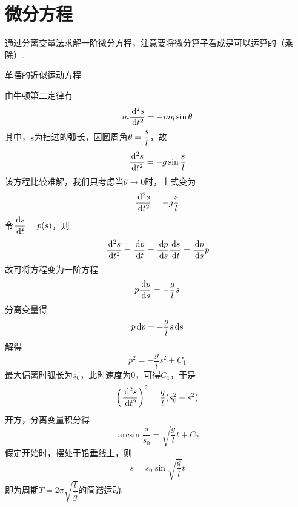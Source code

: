 
\section{微分方程}
通过分离变量法求解一阶微分方程，注意要将微分算子看成是可以运算的（乘除）.
\begin{example}
单摆的近似运动方程.
\end{example}
\begin{analysis}
由牛顿第二定律有
\[m\dfrac{\,\mathrm{d}^2 s}{\,\mathrm{d} t^2}=-mg\sin\theta\]
其中，$s$为扫过的弧长，因圆周角$\displaystyle\theta=\dfrac{s}{l}$，故
\[\dfrac{\,\mathrm{d}^2 s}{\,\mathrm{d} t^2}=-g\sin\dfrac{s}{l}\]
该方程比较难解，我们只考虑当$\theta\to 0$时，上式变为
\[\dfrac{\,\mathrm{d}^2 s}{\,\mathrm{d} t^2}=-g\dfrac{s}{l}\]
令$\dfrac{\,\mathrm{d} s}{\,\mathrm{d} t}=p(s)$，则
\[\dfrac{\,\mathrm{d}^2 s}{\,\mathrm{d} t^2}=\dfrac{\,\mathrm{d} p}{\,\mathrm{d} t}=\dfrac{\,\mathrm{d} p}{\,\mathrm{d} s}\dfrac{\,\mathrm{d} s}{\,\mathrm{d} t}=\dfrac{\,\mathrm{d} p}{\,\mathrm{d} s}p\]
故可将方程变为一阶方程
\[p\dfrac{\,\mathrm{d} p}{\,\mathrm{d} s}=-\dfrac{g}{l}s\]
分离变量得
\[p\,\mathrm{d} p=-\dfrac{g}{l}s\,\mathrm{d} s\]
解得
\[p^2=-\dfrac{g}{l}s^2+C_1\]
最大偏离时弧长为$s_0$，此时速度为$0$，可得$C_1$，于是
\[\left(\dfrac{\,\mathrm{d}^2 s}{\,\mathrm{d} t^2}\right)^2=\dfrac{g}{l}(s_0^2-s^2)\]
开方，分离变量积分得
\[\arcsin\dfrac{s}{s_0}=\sqrt{\dfrac{g}{l}}t+C_2\]
假定开始时，摆处于铅垂线上，则
\[s=s_0\sin\sqrt{\dfrac{g}{l}}t\]
即为周期$T=2\pi\sqrt{\dfrac{l}{g}}$的简谐运动.
\end{analysis}